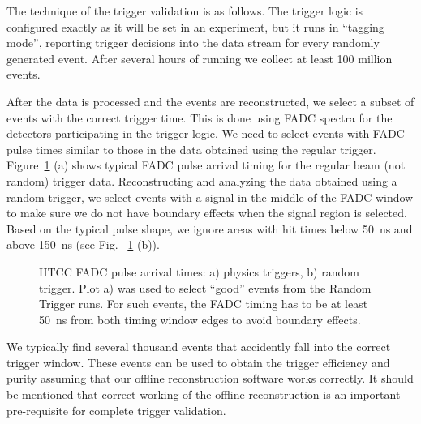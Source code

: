 The technique of the trigger validation is as follows. The trigger logic is configured exactly as it will be set in
an experiment, but it runs in ``tagging mode'', reporting trigger decisions into the data stream for every
randomly generated event. After several hours of running we collect at least 100 million events.

After the data is processed and the events are reconstructed, we select a subset of events with the correct
trigger time. This is done using FADC spectra for the detectors participating in the trigger logic. We need to
select events with FADC pulse times similar to those in the data obtained using the regular trigger.
Figure~\ref{fig:htcc_fadc} (a) shows typical FADC pulse arrival timing for the regular beam (not random) trigger
data. Reconstructing and analyzing the data obtained using a random trigger, we select events with a signal in the
middle of the FADC window to make sure we do not have boundary effects when the signal region is selected. Based
on the typical pulse shape, we ignore areas with hit times below 50~ns and above 150~ns (see
Fig. ~\ref{fig:htcc_fadc} (b)).

\begin{figure}[!htb]
	\centering
	\caption{HTCC FADC pulse arrival times: a) physics triggers, b) random trigger. Plot a) was used to select
          ``good'' events from the Random Trigger runs. For such events, the FADC timing has to be at least 50~ns
          from both timing window edges to avoid boundary effects.}
	\label{fig:htcc_fadc}
\end{figure}

We typically find several thousand events that accidently fall into the correct trigger window. These events
can be used to obtain the trigger efficiency and purity assuming that our offline reconstruction software
works correctly. It should be mentioned that correct working of the offline reconstruction is an important
pre-requisite for complete trigger validation.

